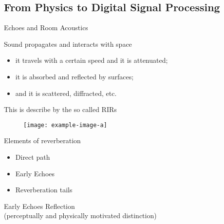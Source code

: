 \subsection{From Physics to Digital Signal Processing}

\begin{frame}{Echoes and Room Acoustics}

    \begin{block}{Sound propagates and interacts with space}
        \begin{itemize}
            \item it \alert{travels} with a certain speed and it is \alert{attenuated};
            \item it is \alert{absorbed} and \alert{reflected} by surfaces;
            \item and it is scattered, diffracted, etc.
        \end{itemize}
    This is describe by the so called RIRs
    \end{block}

    \begin{figure}
        \centering
        \texttt{[image: example-image-a]}
    \end{figure}

    \begin{block}{Elements of reverberation}
        \cite{Shroeder, Allen, Polack, Kuttruff}
        \begin{itemize}
            \item Direct path
            \item \alert{Early Echoes}
            \item Reverberation tails
        \end{itemize}

    \end{block}


    \begin{mydefblock}{Early Echoes}
        Reflection
        \\(perceptually and physically motivated distinction)
    \end{mydefblock}

\end{frame}

